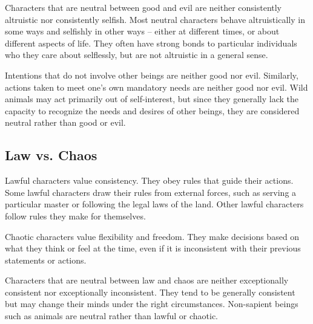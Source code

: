     Characters that are neutral between good and evil are neither consistently altruistic nor consistently selfish.
    Most neutral characters behave altruistically in some ways and selfishly in other ways -- either at different times, or about different aspects of life.
    They often have strong bonds to particular individuals who they care about selflessly, but are not altruistic in a general sense.

    Intentions that do not involve other beings are neither good nor evil.
    Similarly, actions taken to meet one's own mandatory needs are neither good nor evil.
    Wild animals may act primarily out of self-interest, but since they generally lack the capacity to recognize the needs and desires of other beings, they are considered neutral rather than good or evil.

  \subsection{Law vs. Chaos}
     Lawful characters value consistency.
    They obey rules that guide their actions.
    Some lawful characters draw their rules from external forces, such as serving a particular master or following the legal laws of the land.
    Other lawful characters follow rules they make for themselves.

     Chaotic characters value flexibility and freedom.
    They make decisions based on what they think or feel at the time, even if it is inconsistent with their previous statements or actions.

     Characters that are neutral between law and chaos are neither exceptionally consistent nor exceptionally inconsistent.
    They tend to be generally consistent but may change their minds under the right circumstances.
    Non-sapient beings such as animals are neutral rather than lawful or chaotic.

